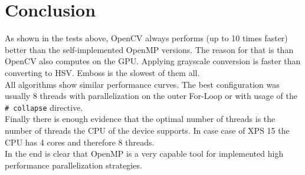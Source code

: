\chapter{Conclusion}

As shown in the tests above, OpenCV always performs (up to 10 times faster) better than the self-implemented OpenMP versions. The reason for that is than OpenCV also computes on the GPU. Applying grayscale conversion is faster than converting to HSV. Emboss is the slowest of them all. \\

All algorithms show similar performance curves. The best configuration was usually 8 threads with parallelization on the outer For-Loop or with usage of the \texttt{# collapse} directive.\\

Finally there is enough evidence that the optimal number of threads is the number of threads the CPU of the device supports. In case case of XPS 15 the CPU has 4 cores and therefore 8 threads.\\

In the end is clear that OpenMP is a very capable tool for implemented high performance parallelization strategies.